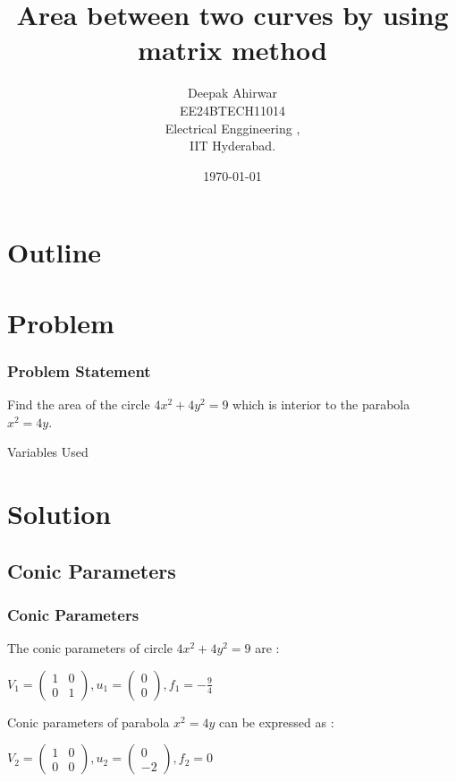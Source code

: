 \documentclass{beamer}
\title{Area between two curves by using matrix method}
\author{Deepak Ahirwar \\EE24BTECH11014 \\ Electrical Enggineering ,\\IIT Hyderabad.}
\date{\today}
\theoremstyle{remark}
\newcommand{\myvec}[1]{\ensuremath{\begin{pmatrix}#1\end{pmatrix}}}
\numberwithin{equation}{section}
\begin{document}
 

\begin{frame}
\titlepage
\end{frame}

\section*{Outline}
\begin{frame}
\tableofcontents
\end{frame}
\section{Problem}
\begin{frame}
\frametitle{Problem Statement}

Find the area of the circle $ 4x^2 + 4y^2 = 9$ which is interior to the parabola $x^2 = 4y.$
\\ \begin{table}[h!]    
  \centering
  
  \caption{Variables Used}
\end{table}

\end{frame}

\section{Solution}
\subsection{Conic Parameters}
\begin{frame}
\frametitle{Conic Parameters}
 The conic parameters of circle $4x^2+4y^2=9$ are :
 \begin{center}
      $V_1 = \myvec{ 1 &0\\ 0 &1}, u_1 =\myvec{0 \\ 0}, f_1 = -\frac{9}{4} $
 \end{center}
 Conic parameters of parabola $x^2=4y$ can be expressed as :
 \begin{center}
      $V_2 = \myvec{ 1 &0\\ 0 &0}, u_2 =\myvec{0 \\ -2}, f_2 = 0$
 \end{center}
 
\end{frame}
\end{document}
